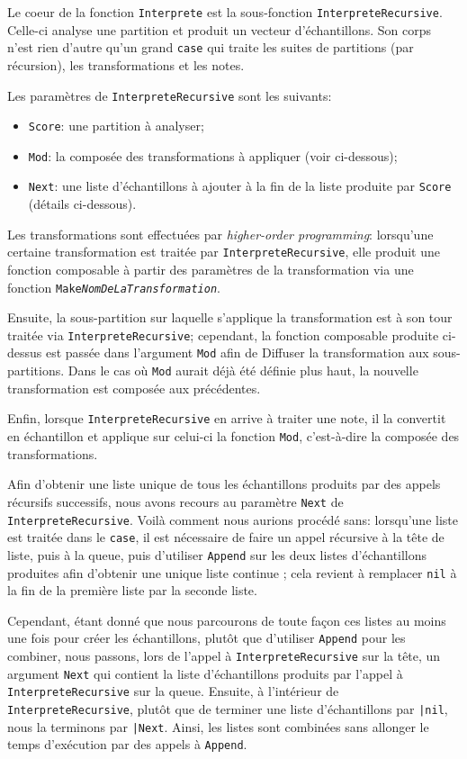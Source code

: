 \documentclass[a4paper,12pt]{article}
\begin{document}
Le coeur de la fonction \texttt{Interprete} est la sous-fonction \texttt{InterpreteRecursive}. Celle-ci analyse une partition et produit un vecteur d'échantillons. Son corps n'est rien d'autre qu'un grand \texttt{case} qui traite les suites de partitions (par récursion), les transformations et les notes.

Les paramètres de \texttt{InterpreteRecursive} sont les suivants:
\begin{itemize}
    \item \texttt{Score}: une partition à analyser;
    \item \texttt{Mod}: la composée des transformations à appliquer (voir ci-dessous);
    \item \texttt{Next}: une liste d'échantillons à ajouter à la fin de la liste produite par \texttt{Score} (détails ci-dessous).
\end{itemize}

Les transformations sont effectuées par \emph{higher-order programming}: lorsqu'une certaine transformation est traitée par \texttt{InterpreteRecursive}, elle produit une fonction composable à partir des paramètres de la transformation via une fonction \texttt{Make\textit{NomDeLaTransformation}}.

Ensuite, la sous-partition sur laquelle s'applique la transformation est à son tour traitée via \texttt{InterpreteRecursive}; cependant, la fonction composable produite ci-dessus est passée dans l'argument \texttt{Mod} afin de \og{}Diffuser\fg{} la transformation aux sous-partitions. Dans le cas où \texttt{Mod} aurait déjà été définie plus haut, la nouvelle transformation est composée aux précédentes.

Enfin, lorsque \texttt{InterpreteRecursive} en arrive à traiter une note, il la convertit en échantillon et applique sur celui-ci la fonction \texttt{Mod}, c'est-à-dire la composée des transformations.

Afin d'obtenir une liste unique de tous les échantillons produits par des appels récursifs successifs, nous avons recours au paramètre \texttt{Next} de \texttt{InterpreteRecursive}. Voilà comment nous aurions procédé sans: lorsqu'une liste est traitée dans le \texttt{case}, il est nécessaire de faire un appel récursive à la tête de liste, puis à la queue, puis d'utiliser \texttt{Append} sur les deux listes d'échantillons produites afin d'obtenir une unique liste continue ; cela revient à remplacer \texttt{nil} à la fin de la première liste par la seconde liste.

Cependant, étant donné que nous parcourons de toute façon ces listes au moins une fois pour créer les échantillons, plutôt que d'utiliser \texttt{Append} pour les combiner, nous passons, lors de l'appel à \texttt{InterpreteRecursive} sur la tête, un argument \texttt{Next} qui contient la liste d'échantillons produits par l'appel à \texttt{InterpreteRecursive} sur la queue. Ensuite, à l'intérieur de \texttt{InterpreteRecursive}, plutôt que de terminer une liste d'échantillons par \texttt{|nil}, nous la terminons par \texttt{|Next}. Ainsi, les listes sont combinées sans allonger le temps d'exécution par des appels à \texttt{Append}.
\end{document}

